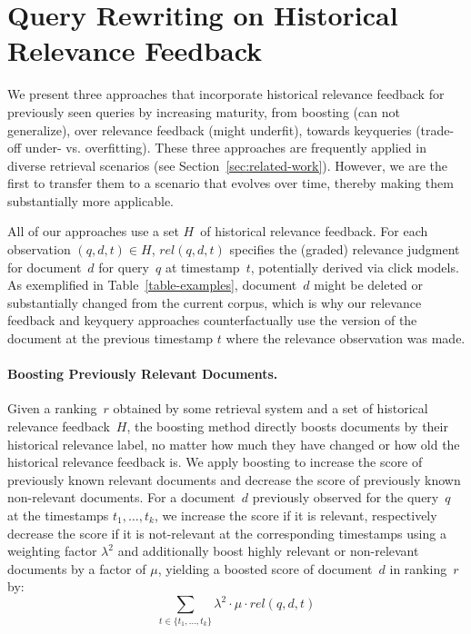 \section{Query Rewriting on Historical Relevance Feedback}

We present three approaches that incorporate historical relevance feedback for previously seen queries by increasing maturity, from \Ni boosting (can not generalize), over \Nii relevance feedback (might underfit), towards \Niii keyqueries (trade-off under- vs. overfitting). These three approaches are frequently applied in diverse retrieval scenarios (see Section~\ref{sec:related-work}). However, we are the first to transfer them to a scenario that evolves over time, thereby making them substantially more applicable.

All of our approaches use a set $H$~of historical relevance feedback. For each observation $(q, d, t) \in H$, $rel(q, d, t)$ specifies the (graded) relevance judgment for document~$d$ for query~$q$ at timestamp~$t$, potentially derived via click models. As exemplified in Table~\ref{table-examples}, document~$d$ might be deleted or substantially changed from the current corpus, which is why our relevance feedback and keyquery approaches counterfactually use the version of the document at the previous timestamp $t$ where the relevance observation was made.

\paragraph{Boosting Previously Relevant Documents.} Given a ranking~$r$ obtained by some retrieval system and a set of historical relevance feedback~$H$, the boosting method directly boosts documents by their historical relevance label, no matter how much they have changed or how old the historical relevance feedback is. We apply boosting to increase the score of previously known relevant documents and decrease the score of previously known non-relevant documents. For a document~$d$ previously observed for the query~$q$ at the timestamps $t_{1}, \ldots, t_{k}$, we increase the score if it is relevant, respectively decrease the score if it is not-relevant at the corresponding timestamps using a weighting factor $\lambda^2$ and additionally boost highly relevant or non-relevant documents by a factor of $\mu$, yielding a boosted score of document~$d$ in ranking~$r$ by:
\begin{equation}
\sum\limits_{t \in \{t_{1}, \ldots, t_{k}\}} \lambda^2 \cdot \mu \cdot rel(q,d,t)
\end{equation}

